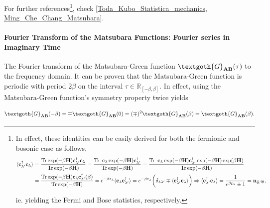 For further references\footnote{In effect, these identities can be easily derived for both the fermionic and bosonic case as follows,  
    \begin{equation}
        \begin{split}
            \langle {\bf c}_{\lambda'}^\dagger {\bf c}_{\lambda} \rangle &= \frac{\Tr \exp(-\beta {\bf H}) {\bf c}_{\lambda'}^\dagger {\bf c}_{\lambda} }{\Tr \exp(-\beta {\bf H})} = \frac{\Tr \textnormal{ } {\bf c}_{\lambda} \exp(-\beta {\bf H}) {\bf c}_{\lambda'}^\dagger}{\Tr \exp(-\beta {\bf H})} = \frac{\Tr \textnormal{ } {\bf c}_{\lambda} \exp(-\beta {\bf H}) {\bf c}_{\lambda'}^\dagger
            \exp(-\beta {\bf H})
            \exp(\beta {\bf H})
            }{\Tr \exp(-\beta {\bf H})}
            \\
            &= \frac{\Tr \exp(-\beta {\bf H}) {\bf c}_{\lambda}{\bf c}_{\lambda'}^\dagger(\beta)
            }{\Tr \exp(-\beta {\bf H})} = e^{-\beta \varepsilon_{\lambda}} \langle {\bf c}_{\lambda}{\bf c}_{\lambda'}^\dagger \rangle =  e^{-\beta \varepsilon_{\lambda}} \bigg(
            \delta_{\lambda\lambda'} \mp \langle {\bf c}_{\lambda'}^\dagger {\bf c}_{\lambda} \rangle
            \bigg) \Rightarrow \langle {\bf c}_{\lambda'}^\dagger {\bf c}_{\lambda} \rangle = \frac{1}{e^{\beta \varepsilon_{\lambda}} \pm 1} = {\bf n}_{\mathfrak{F}, \mathfrak{B}},
        \end{split}
    \end{equation} 
    
    ie. yielding the Fermi and Bose statistics, respectively. 
    }, check \cref{Toda_Kubo_Statistica_mechanics, Ming_Che_Chang_Matsubara}. \\
    
\paragraph{Fourier Transform of the Matsubara Functions: Fourier series in Imaginary Time}

The Fourier transform of the Matsubara-Green function ${\textgoth{G}_{{\bf AB}}}(\tau)$ to the frequency domain. It can be proven that the Matsubara-Green function is periodic with period $2\beta$ on the interval $\tau \in \mathds{R}_{[-{\beta}, \beta]}$. In effect, using the Matsubara-Green function's symmetry property twice yields

\begin{equation}
    {\textgoth{G}_{{\bf AB}}}(-\beta) = \mp {\textgoth{G}_{{\bf AB}}}(0) = (\mp)^2 {\textgoth{G}_{{\bf AB}}}(\beta) =  {\textgoth{G}_{{\bf AB}}}(\beta). 
\end{equation}

